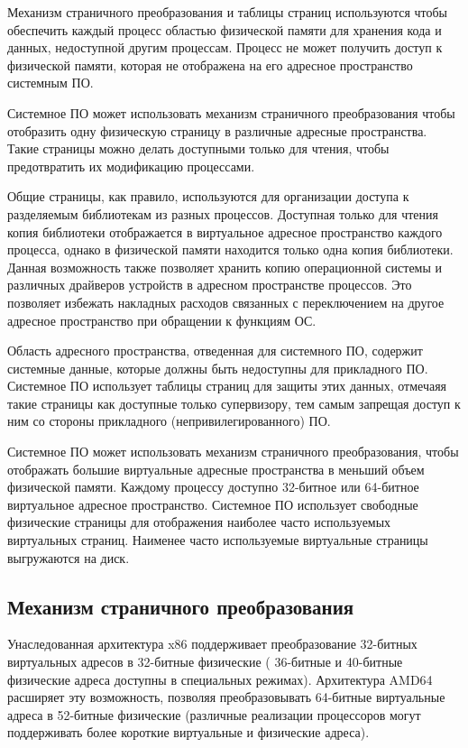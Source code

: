 Механизм страничного преобразования и таблицы страниц используются чтобы обеспечить
каждый процесс областью физической памяти для хранения кода и данных, недоступной другим процессам.
Процесс не может получить доступ к физической памяти, которая не отображена на его адресное
пространство системным ПО.

Системное ПО может использовать механизм страничного преобразования чтобы отобразить одну физическую
страницу в различные адресные пространства. Такие страницы можно делать доступными только для чтения,
чтобы предотвратить их модификацию процессами.

Общие страницы, как правило, используются для организации доступа к разделяемым библиотекам из
разных процессов. Доступная только для чтения копия библиотеки отображается в виртуальное адресное
пространство каждого процесса, однако в физической памяти находится только одна копия библиотеки.
Данная возможность также позволяет хранить копию операционной системы и различных драйверов устройств
в адресном пространстве процессов. Это позволяет избежать накладных расходов связанных с переключением
на другое адресное пространство при обращении к функциям ОС.

Область адресного пространства, отведенная для системного ПО, содержит системные данные, которые
должны быть недоступны для прикладного ПО. Системное ПО использует таблицы страниц для защиты этих
данных, отмечаяя такие страницы как доступные только супервизору, тем самым запрещая доступ к ним со
стороны прикладного (непривилегированного) ПО.

Системное ПО может использовать механизм страничного преобразования, чтобы отображать большие
виртуальные адресные пространства в меньший объем физической памяти. Каждому процессу доступно
32-битное или 64-битное виртуальное адресное пространство. Системное ПО использует свободные
физические страницы для отображения наиболее часто используемых виртуальных страниц. Наименее часто
используемые виртуальные страницы выгружаются на диск.

\subsection{Механизм страничного преобразования}
Унаследованная архитектура x86 поддерживает преобразование 32-битных виртуальных адресов в 32-битные физические (
36-битные и 40-битные физические адреса доступны в специальных режимах). Архитектура AMD64 расширяет эту возможность,
позволяя преобразовывать 64-битные виртуальные адреса в 52-битные физические (различные реализации процессоров
могут поддерживать более короткие виртуальные и физические адреса).

